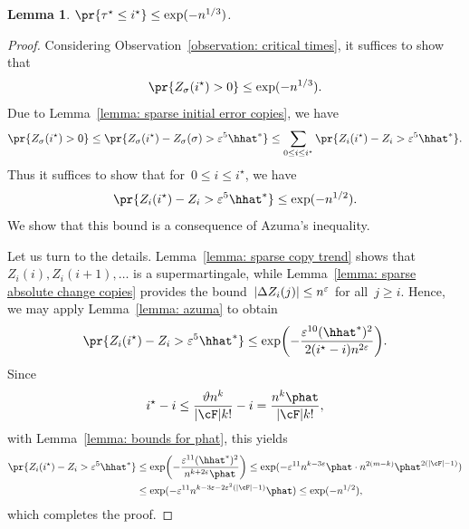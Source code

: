 \documentclass[11pt]{amsart}
\newcommand{\eps}{\varepsilon}
\DeclarePairedDelimiter{\paren}{\lparen}{\rparen}
\DeclarePairedDelimiter{\abs}{\lvert}{\rvert}
\renewcommand{\theta}{\vartheta}
\newtheorem{lemma}[algocf]{Lemma}
\theoremstyle{definition}
\numberwithin{equation}{section}
\begin{document}
	\begin{lemma}\label{lemma: copy control}
		$\pr{\tau^\star\leq i^\star}\leq \exp(-n^{1/3})$.
	\end{lemma}
	\begin{proof}
		Considering Observation~\ref{observation: critical times}, it suffices to show that
		\begin{equation*}
			\pr{Z_\sigma(i^\star)>0}\leq \exp(-n^{1/3}).
		\end{equation*}
		Due to Lemma~\ref{lemma: sparse initial error copies}, we have
		\begin{equation*}
			\begin{aligned}
				\pr{Z_\sigma(i^\star)>0}
				\leq \pr{Z_\sigma(i^\star)-Z_\sigma(\sigma)>\eps^5\hhat^*}
				\leq \sum_{0\leq i\leq i^\star}\pr{Z_i(i^\star)-Z_i>\eps^5\hhat^*}.
			\end{aligned}
		\end{equation*}
		Thus it suffices to show that for~$0\leq i\leq i^\star$, we have
		\begin{equation*}
			\pr{Z_i(i^\star)-Z_i>\eps^5\hhat^*}\leq \exp(-n^{1/2}).
		\end{equation*}
		We show that this bound is a consequence of Azuma's inequality.
		
		Let us turn to the details.
		Lemma~\ref{lemma: sparse copy trend} shows that~$Z_i(i),Z_i(i+1),\ldots$ is a supermartingale, while Lemma~\ref{lemma: sparse absolute change copies} provides the bound~$\abs{\Delta Z_i(j)}\leq n^\eps$ for all~$j\geq i$.
		Hence, we may apply Lemma~\ref{lemma: azuma} to obtain
		\begin{equation*}
			\pr{Z_i(i^\star)-Z_i>\eps^5\hhat^*}
			\leq \exp\paren[\bigg]{-\frac{\eps^{10}(\hhat^*)^2}{2(i^\star-i) n^{2\eps}}}.
		\end{equation*}
		Since
		\begin{equation*}
			i^\star-i
			\leq \frac{\theta n^k}{\abs{\cF}k!}-i
			=\frac{n^k\phat}{\abs{\cF}k!},
		\end{equation*}
		with Lemma~\ref{lemma: bounds for phat}, this yields
		\begin{equation*}
			\begin{aligned}
				\pr{Z_i(i^\star)-Z_i>\eps^5\hhat^*}
				&\leq \exp\paren[\bigg]{-\frac{\eps^{11}(\hhat^*)^2}{n^{k+2\eps}\phat}}
				\leq \exp\paren{-\eps^{11} n^{k-3\eps}\phat \cdot n^{2(m-k)}\phat^{2(\abs{\cF}-1)}}\\
				&\leq \exp\paren{-\eps^{11} n^{k-3\eps-2\eps^2(\abs{\cF}-1)}\phat}
				\leq \exp(-n^{1/2}),
			\end{aligned}
		\end{equation*}
		which completes the proof.
	\end{proof}
	
\end{document}
